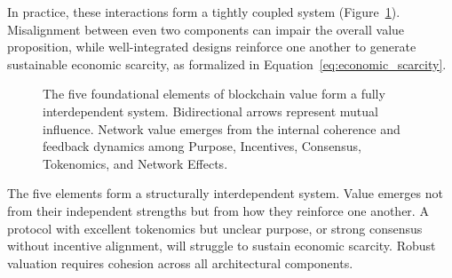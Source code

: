 \documentclass[12pt]{article}
\begin{document}
In practice, these interactions form a tightly coupled system (Figure~\ref{fig:element_interaction}). Misalignment between even two components can impair the overall value proposition, while well-integrated designs reinforce one another to generate sustainable economic scarcity, as formalized in Equation~\ref{eq:economic_scarcity}.

\begin{figure}[H]
\centering
{}
\caption{The five foundational elements of blockchain value form a fully interdependent system. Bidirectional arrows represent mutual influence. Network value emerges from the internal coherence and feedback dynamics among Purpose, Incentives, Consensus, Tokenomics, and Network Effects.}
\label{fig:element_interaction}
\end{figure}

\begin{tcolorbox}[title=\textbf{Remark: Blockchain Value as a Systemic Outcome}]
The five elements form a structurally interdependent system. Value emerges not from their independent strengths but from how they reinforce one another. A protocol with excellent tokenomics but unclear purpose, or strong consensus without incentive alignment, will struggle to sustain economic scarcity. Robust valuation requires cohesion across all architectural components.
\end{tcolorbox}



\end{document}
